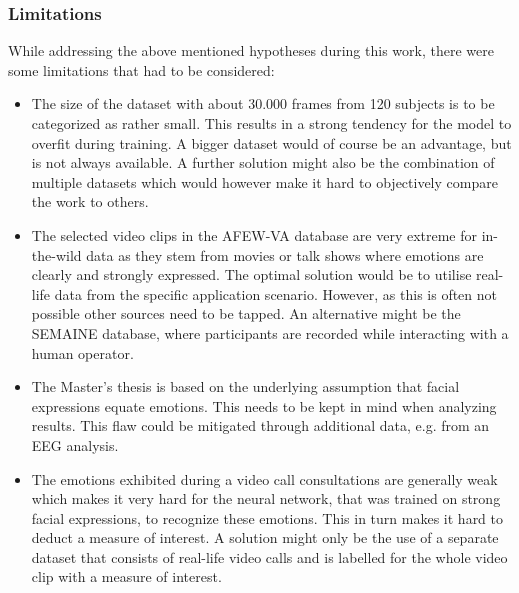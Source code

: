 \subsubsection{Limitations}
While addressing the above mentioned hypotheses during this work, there were some limitations that had to be considered:

\begin{itemize}
    \item The size of the dataset with about 30.000 frames from 120 subjects is to be categorized as rather small. This results in a strong tendency for the model to overfit during training. A bigger dataset would of course be an advantage, but is not always available. A further solution might also be the combination of multiple datasets which would however make it hard to objectively compare the work to others.
    \item The selected video clips in the AFEW-VA database are very extreme for in-the-wild data as they stem from movies or talk shows where emotions are clearly and strongly expressed. The optimal solution would be to utilise real-life data from the specific application scenario. However, as this is often not possible other sources need to be tapped. An alternative might be the SEMAINE database, where participants are recorded while interacting with a human operator.
    \item The Master's thesis is based on the underlying assumption that facial expressions equate emotions. This needs to be kept in mind when analyzing results. This flaw could be mitigated through additional data, e.g. from an EEG analysis.
    \item The emotions exhibited during a video call consultations are generally weak which makes it very hard for the neural network, that was trained on strong facial expressions, to recognize these emotions. This in turn makes it hard to deduct a measure of interest. A solution might only be the use of a separate dataset that consists of real-life video calls and is labelled for the whole video clip with a measure of interest.
\end{itemize}

